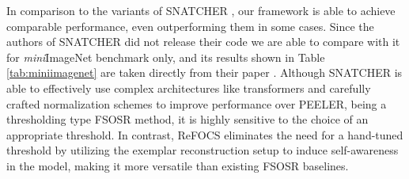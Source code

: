 In comparison to the variants of SNATCHER \cite{snatcher}, our framework is able to achieve comparable performance, even outperforming them in some cases. Since the authors of SNATCHER did not release their code we are able to compare with it for \textit{mini}ImageNet benchmark only, and its results shown in Table \ref{tab:miniimagenet} are taken directly from their paper \cite{snatcher}. Although SNATCHER is able to effectively use complex architectures like transformers \cite{vaswani2017attention} and carefully crafted normalization schemes to improve performance over PEELER, being a thresholding type FSOSR method, it is highly sensitive to the choice of an appropriate threshold. In contrast, ReFOCS eliminates the need for a hand-tuned threshold by utilizing the exemplar reconstruction setup to induce self-awareness in the model, making it more versatile than existing FSOSR baselines.


